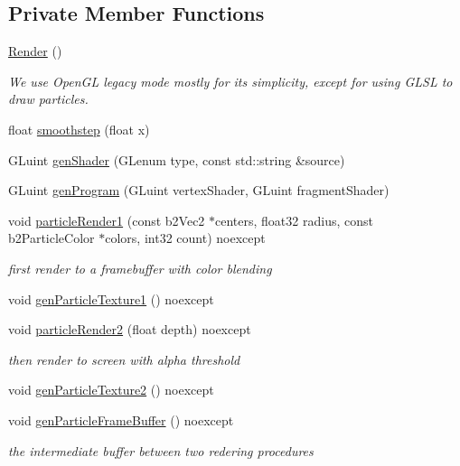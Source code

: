 \subsection*{Private Member Functions}
\begin{DoxyCompactItemize}
\item 
\hyperlink{classRender_a8610cc11739ef679b5935dd819021351}{Render} ()
\begin{DoxyCompactList}\small\item\em We use Open\+G\+L legacy mode mostly for its simplicity, except for using G\+L\+S\+L to draw particles. \end{DoxyCompactList}\item 
float \hyperlink{classRender_a78eb29ef18ac02ca40ed7d56a567422f}{smoothstep} (float x)
\item 
G\+Luint \hyperlink{classRender_a27245fbd3dfe8cda287db16c290a61ae}{gen\+Shader} (G\+Lenum type, const std\+::string \&source)
\item 
G\+Luint \hyperlink{classRender_a8098e3ac9815da6131f7b2ba7814fba1}{gen\+Program} (G\+Luint vertex\+Shader, G\+Luint fragment\+Shader)
\item 
void \hyperlink{classRender_aaac722352d954c5eac9234862b1db2c1}{particle\+Render1} (const b2\+Vec2 $\ast$centers, float32 radius, const b2\+Particle\+Color $\ast$colors, int32 count) noexcept
\begin{DoxyCompactList}\small\item\em first render to a framebuffer with color blending \end{DoxyCompactList}\item 
void \hyperlink{classRender_a842a6ab5beca59cc7f0d01f6dcc16e8e}{gen\+Particle\+Texture1} () noexcept
\item 
void \hyperlink{classRender_a91afc04b948c272f91510092d1a5a4f1}{particle\+Render2} (float depth) noexcept
\begin{DoxyCompactList}\small\item\em then render to screen with alpha threshold \end{DoxyCompactList}\item 
void \hyperlink{classRender_aaf7b3afb9f0590a72004db328b612108}{gen\+Particle\+Texture2} () noexcept
\item 
void \hyperlink{classRender_a6a4069759ea5c3f5b874417a6d699471}{gen\+Particle\+Frame\+Buffer} () noexcept
\begin{DoxyCompactList}\small\item\em the intermediate buffer between two redering procedures \end{DoxyCompactList}\item 

\end{DoxyCompactItemize}
